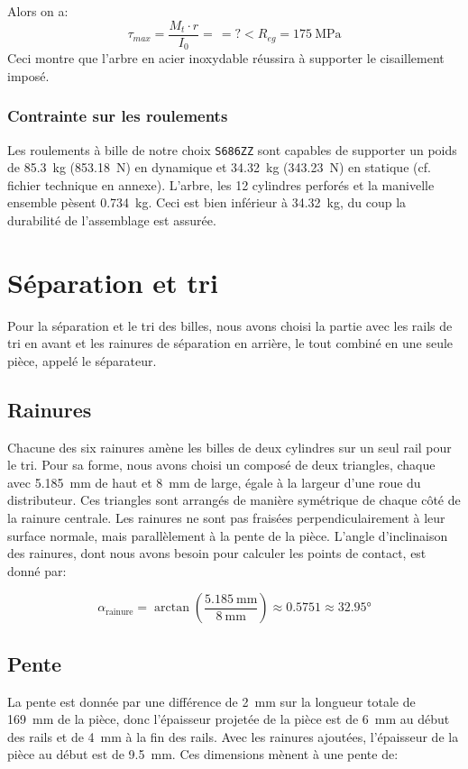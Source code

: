 Alors on a:
\[\tau_{max} = \frac{M_{t}\cdot r}{I_{0}} = \frac{}{} = ? < R_{eg} = \SI{175}{\mega\pascal}\]
Ceci montre que l'arbre en acier inoxydable réussira à supporter le cisaillement imposé.

\subsubsection{Contrainte sur les roulements}
Les roulements à bille de notre choix \texttt{S686ZZ} sont capables de supporter un poids de \SI{85.3}{\kg} (\SI{853.18}{N}) en dynamique et \SI{34.32}{\kg} (\SI{343.23}{N}) en statique (cf. fichier technique en annexe). L'arbre, les 12 cylindres perforés et la manivelle ensemble pèsent \SI{0.734}{\kg}. Ceci est bien inférieur à \SI{34.32}{\kg}, du coup la durabilité de l'assemblage est assurée.
\section{Séparation et tri}
Pour la séparation et le tri des billes, nous avons choisi la partie avec les rails de tri en avant et les rainures de séparation en arrière, le tout combiné en une seule pièce, appelé le séparateur.

\subsection{Rainures}
Chacune des six rainures amène les billes de deux cylindres sur un seul rail pour le tri. Pour sa forme, nous avons choisi un composé de deux triangles, chaque avec \SI{5,185}{\milli\metre} de haut et \SI{8}{\milli\metre} de large, égale à la largeur d'une roue du distributeur. Ces triangles sont arrangés de manière symétrique de chaque côté de la rainure centrale. Les rainures ne sont pas fraisées perpendiculairement à leur surface normale, mais parallèlement à la pente de la pièce. L'angle d'inclinaison des rainures, dont nous avons besoin pour calculer les points de contact, est donné par:

\[\alpha_{\text{rainure}} = \arctan\left(\frac{\SI{5.185}{\milli\metre}}{\SI{8}{\milli\metre}}\right) \approx \num{0.5751} \approx \ang{32.95}\]

\subsection{Pente}
La pente est donnée par une différence de \SI{2}{\milli\metre} sur la longueur totale de \SI{169}{\milli\metre} de la pièce, donc l'épaisseur projetée de la pièce est de \SI{6}{\mm} au début des rails et de \SI{4}{\mm} à la fin  des rails. Avec les rainures ajoutées, l'épaisseur de la pièce au début est de \SI{9.5}{\mm}. Ces dimensions mènent à une pente de:

